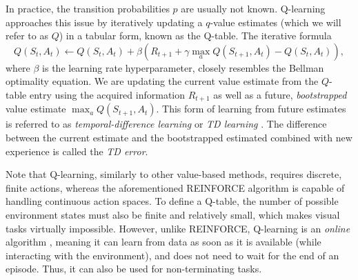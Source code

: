 In practice, the transition probabilities $p$ are usually not known. Q-learning \cite{q-learning} approaches this issue by iteratively updating a $q$-value estimates (which we will refer to as $Q$) in a tabular form, known as the Q-table. The iterative formula
\begin{equation*}
    Q\left(S_t, A_t\right) \gets Q\left(S_t, A_t\right) + \beta\left(R_{t+1} + \gamma \max_a Q\left(S_{t+1}, A_t\right) - Q\left(S_t, A_t\right)\right),
\end{equation*}
where $\beta$ is the learning rate hyperparameter, closely resembles the Bellman optimality equation. We are updating the current value estimate from the $Q$-table entry using the acquired information $R_{t+1}$ as well as a future, \textit{bootstrapped} value estimate $\max_a Q\left(S_{t+1}, A_t\right)$. This form of learning from future estimates is referred to as \textit{temporal-difference learning} or \textit{TD learning} \cite{td-learning}. The difference between the current estimate and the bootstrapped estimated combined with new experience is called the \textit{TD error}.

Note that Q-learning, similarly to other value-based methods, requires discrete, finite actions, whereas the aforementioned REINFORCE algorithm is capable of handling continuous action spaces. To define a Q-table, the number of possible environment states must also be finite and relatively small, which makes visual tasks virtually impossible. However, unlike REINFORCE, Q-learning is an \mbox{\textit{online}} algorithm \cite{bible}, meaning it can learn from data as soon as it is available (while interacting with the environment), and does not need to wait for the end of an episode. Thus, it can also be used for non-terminating tasks.